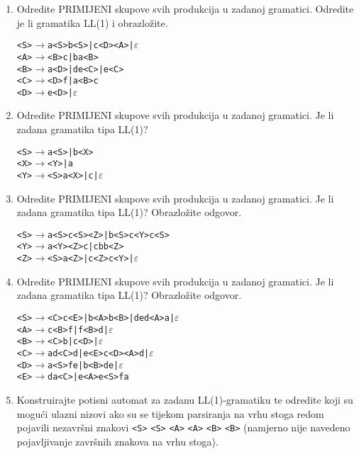 \documentclass[times, 12pt, utf8]{book}
\begin{document}
\begin{enumerate}[resume]
\item
Odredite PRIMIJENI skupove svih produkcija u zadanoj gramatici.
Odredite je li gramatika LL(1) i obrazložite. \cite[str.~100]{udzbenik}

\begin{alltt} 
<S> \(\to\) a<S>b<S> | c<D><A> | \(\varepsilon\)
<A> \(\to\) <B>c | ba<B>
<B> \(\to\) a<D> | de<C> | e<C>
<C> \(\to\) <D>f | a<B>c
<D> \(\to\) e<D> | \(\varepsilon\)
\end{alltt} 

\item
Odredite PRIMIJENI skupove svih produkcija u zadanoj gramatici.
Je li zadana gramatika tipa LL(1)? \cite[str.~100]{udzbenik}

\begin{alltt}
<S> \(\to\) a<S> | b<X>
<X> \(\to\) <Y> | a
<Y> \(\to\) <S>a<X> | c | \(\varepsilon\)
\end{alltt} 

\item
Odredite PRIMIJENI skupove svih produkcija u zadanoj gramatici.
Je li zadana gramatika tipa LL(1)?
Obrazložite odgovor. \cite[str.~100]{udzbenik}

\begin{alltt}
<S> \(\to\) a<S>c<S><Z> | b<S>c<Y>c<S>
<Y> \(\to\) a<Y><Z>c | cbb<Z>
<Z> \(\to\) <S>a<Z> | c<Z>c<Y> | \(\varepsilon\)
\end{alltt} 

\item
Odredite PRIMIJENI skupove svih produkcija u zadanoj gramatici.
Je li zadana gramatika tipa LL(1)?
Obrazložite odgovor. \cite[str.~100]{udzbenik}

\begin{alltt}
<S> \(\to\) <C>c<E> | b<A>b<B> | ded<A>a | \(\varepsilon\)
<A> \(\to\) c<B>f | f<B>d | \(\varepsilon\)
<B> \(\to\) <C>b | c<D> | \(\varepsilon\)
<C> \(\to\) ad<C>d | e<E>c<D><A>d | \(\varepsilon\)
<D> \(\to\) a<S>fe | b<B>de | \(\varepsilon\)
<E> \(\to\) da<C> | e<A>e<S>fa
\end{alltt} 

\item
Konstruirajte potisni automat za zadanu LL(1)-gramatiku te odredite koji su mogući ulazni nizovi ako su se tijekom parsiranja na vrhu stoga redom pojavili nezavršni znakovi \texttt{<S>} \texttt{<S>} \texttt{<A>} \texttt{<A>} \texttt{<B>} \texttt{<B>} (namjerno nije navedeno pojavljivanje završnih znakova na vrhu stoga). \cite[str.~99]{udzbenik}


\end{enumerate}
\end{document}
